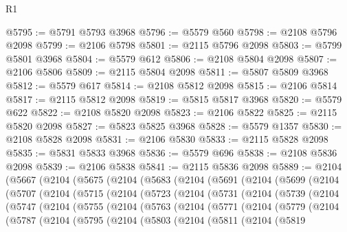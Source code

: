 \begin{lexlean}{R1}
\begin{coremodule}
@5795 := @5791 @5793 @3968
@5796 := @5579 @560
@5798 := @2108 @5796 @2098
@5799 := @2106 @5798
@5801 := @2115 @5796 @2098
@5803 := @5799 @5801 @3968
@5804 := @5579 @612
@5806 := @2108 @5804 @2098
@5807 := @2106 @5806
@5809 := @2115 @5804 @2098
@5811 := @5807 @5809 @3968
@5812 := @5579 @617
@5814 := @2108 @5812 @2098
@5815 := @2106 @5814
@5817 := @2115 @5812 @2098
@5819 := @5815 @5817 @3968
@5820 := @5579 @622
@5822 := @2108 @5820 @2098
@5823 := @2106 @5822
@5825 := @2115 @5820 @2098
@5827 := @5823 @5825 @3968
@5828 := @5579 @1357
@5830 := @2108 @5828 @2098
@5831 := @2106 @5830
@5833 := @2115 @5828 @2098
@5835 := @5831 @5833 @3968
@5836 := @5579 @696
@5838 := @2108 @5836 @2098
@5839 := @2106 @5838
@5841 := @2115 @5836 @2098
@5889 := @2104
    (@5667
      (@2104
        (@5675
          (@2104
            (@5683
              (@2104
                (@5691
                  (@2104
                    (@5699
                      (@2104
                        (@5707
                          (@2104
                            (@5715
                              (@2104
                                (@5723
                                  (@2104
                                    (@5731
                                      (@2104
                                        (@5739
                                          (@2104
                                            (@5747
                                              (@2104
                                                (@5755
                                                  (@2104
                                                    (@5763
                                                      (@2104
                                                        (@5771
                                                          (@2104
                                                            (@5779
                                                              (@2104
                                                                (@5787
                                                                  (@2104
                                                                    (@5795
                                                                      (@2104
                                                                        (@5803
                                                                          (@2104
                                                                            (@5811
                                                                              (@2104
                                                                                (@5819

\end{coremodule}
\end{lexlean}
